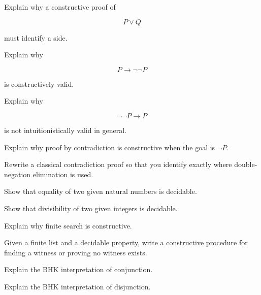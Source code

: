 \begin{exercise}[2]
Explain why a constructive proof of

\[
P\lor Q
\]

must identify a side.
\end{exercise}

\begin{exercise}[2]
Explain why

\[
P\rightarrow\neg\neg P
\]

is constructively valid.
\end{exercise}

\begin{exercise}[3]
Explain why

\[
\neg\neg P\rightarrow P
\]

is not intuitionistically valid in general.
\end{exercise}

\begin{exercise}[2]
Explain why proof by contradiction is constructive when the goal is
\(\neg P\).
\end{exercise}

\begin{exercise}[3]
Rewrite a classical contradiction proof so that you identify exactly where
double-negation elimination is used.
\end{exercise}

\begin{exercise}[2]
Show that equality of two given natural numbers is decidable.
\end{exercise}

\begin{exercise}[2]
Show that divisibility of two given integers is decidable.
\end{exercise}

\begin{exercise}[2]
Explain why finite search is constructive.
\end{exercise}

\begin{exercise}[3]
Given a finite list and a decidable property, write a constructive procedure
for finding a witness or proving no witness exists.
\end{exercise}

\begin{exercise}[3]
Explain the BHK interpretation of conjunction.
\end{exercise}

\begin{exercise}[3]
Explain the BHK interpretation of disjunction.
\end{exercise}

